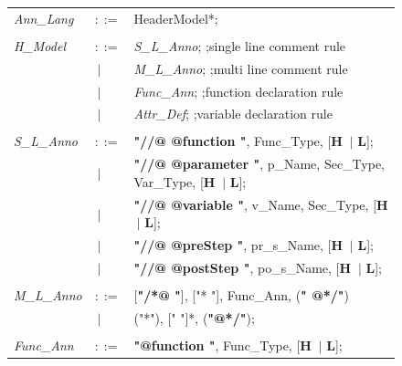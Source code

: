  \begin{figure}[ht!]
 	\centering
 	\begin{tabular}{lll}
 		
 		\footnotesize                       
 		\textit{Ann\_Lang}           &\footnotesize $::=$         &\footnotesize HeaderModel*;       \\ \\
 		
 		\footnotesize
 		\textit{H\_Model}            &\footnotesize $::=$         &\footnotesize \textit{S\_L\_Anno};       \hfill ;single line comment rule   \\     
 		&\footnotesize $\ \vert $    &\footnotesize \textit{M\_L\_Anno};       \hfill ;multi line comment rule    \\ 
 		&\footnotesize $\ \vert $    &\footnotesize \textit{Func\_Ann};       \hfill ;function declaration rule  \\ 
 		&\footnotesize $\ \vert $    &\footnotesize \textit{Attr\_Def};        \hfill ;variable declaration rule  \\ \\
 		\footnotesize  	
 		\textit{S\_L\_Anno}          &\footnotesize $::=$         &\footnotesize \textbf{"//@ @function "},    Func\_Type,              [\textbf{H} $\ \vert $  \textbf{L}];     \\
 		&\footnotesize $\ \vert $    &\footnotesize \textbf{"//@ @parameter "},   p\_Name,  Sec\_Type, Var\_Type,    [\textbf{H} $\ \vert $  \textbf{L}];    \\
 		&\footnotesize $\ \vert $    &\footnotesize \textbf{"//@ @variable "},    v\_Name,  Sec\_Type,     [\textbf{H} $\ \vert $  \textbf{L}];    \\
 		&\footnotesize $\ \vert $    &\footnotesize \textbf{"//@ @preStep "},     pr\_s\_Name,             [\textbf{H} $\ \vert $  \textbf{L}];    \\
 		&\footnotesize $\ \vert $    &\footnotesize \textbf{"//@ @postStep "},    po\_s\_Name,             [\textbf{H} $\ \vert $  \textbf{L}];    \\ \\   
 		\footnotesize            
 		\textit{M\_L\_Anno}          &\footnotesize $::=$         &\footnotesize [\textbf{"/*@ "}],  ["* "],  Func\_Ann,  (\textbf{" @*/"}) \\
 		&\footnotesize $\ \vert $    &\footnotesize ("*"), [" "]*, (\textbf{"@*/"});                  \\ \\
 		\footnotesize        
 		\textit{Func\_Ann}           &\footnotesize $::=$         &\footnotesize \textbf{"@function "},    Func\_Type,              [\textbf{H} $\ \vert $  \textbf{L}];     \\

\end{tabular}
\end{figure}
